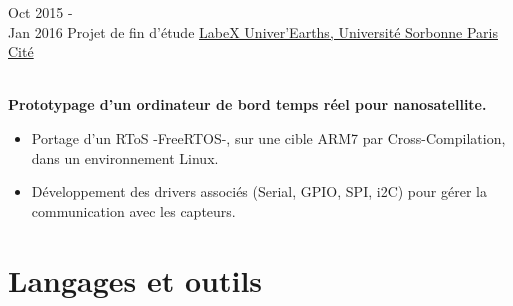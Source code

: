 \documentclass[letterpaper]{twentysecondcv} %
\begin{document}
\begin{twenty}
{        }
        
     \twentyitem
   		{Oct 2015 - \\ Jan 2016}
        {Projet de fin d'étude}
        {\href{http://www.synechron.com/}{LabeX Univer'Earths, Université Sorbonne Paris Cité}}
        {}
        {\\ \textbf{Prototypage d'un ordinateur de bord temps réel pour nanosatellite.}
        
        \begin{itemize}
        \item Portage d'un RToS -FreeRTOS-, sur une cible ARM7 par Cross-Compilation, dans un environnement Linux.
        \item Développement des drivers associés (Serial, GPIO, SPI, i2C) pour g\'erer la communication avec les capteurs.
       
    \end{itemize}
    	}    
\end{twenty}


\section{Langages et outils}

\begin{twentyshort} %
	
\end{twentyshort}
\end{document}
